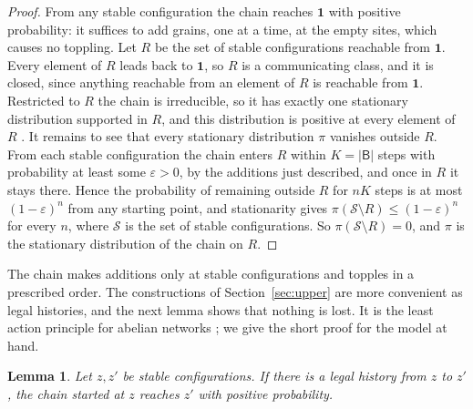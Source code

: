 \documentclass[11pt]{amsart}
\newtheorem{lemma}[theorem]{Lemma}
\theoremstyle{definition}
\newcommand{\one}{\mathbf 1}
\newcommand{\B}{\mathsf B}
\begin{document}
\begin{proof}
From any stable configuration the chain reaches $\one$ with positive probability: it suffices to add grains, one at a time, at the empty sites, which causes no toppling. Let $R$ be the set of stable configurations reachable from $\one$. Every element of $R$ leads back to $\one$, so $R$ is a communicating class, and it is closed, since anything reachable from an element of $R$ is reachable from $\one$. Restricted to $R$ the chain is irreducible, so it has exactly one stationary distribution supported in $R$, and this distribution is positive at every element of $R$ \cite[\S1.7]{Nor97}. It remains to see that every stationary distribution $\pi$ vanishes outside $R$. From each stable configuration the chain enters $R$ within $K=|\B|$ steps with probability at least some $\varepsilon>0$, by the additions just described, and once in $R$ it stays there. Hence the probability of remaining outside $R$ for $nK$ steps is at most $(1-\varepsilon)^n$ from any starting point, and stationarity gives $\pi(\mathcal S\setminus R)\le(1-\varepsilon)^n$ for every $n$, where $\mathcal S$ is the set of stable configurations. So $\pi(\mathcal S\setminus R)=0$, and $\pi$ is the stationary distribution of the chain on $R$.
\end{proof}

The chain makes additions only at stable configurations and topples in a prescribed order. The constructions of Section~\ref{sec:upper} are more convenient as legal histories, and the next lemma shows that nothing is lost. It is the least action principle for abelian networks \cite{FLP10,BL16}; we give the short proof for the model at hand.

\begin{lemma}\label{lem:realize}
Let $z,z'$ be stable configurations. If there is a legal history from $z$ to $z'$, the chain started at $z$ reaches $z'$ with positive probability.
\end{lemma}
\end{document}
